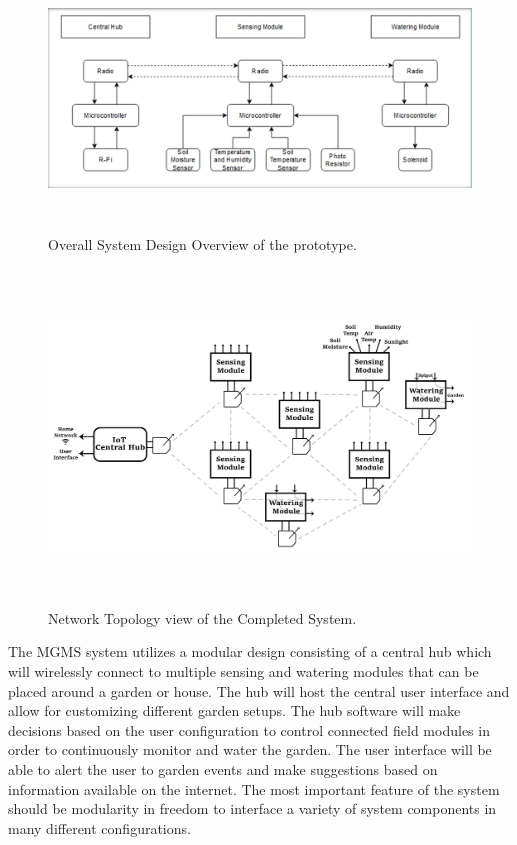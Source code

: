 \documentclass{report}
\begin{document}
\begin{figure}[H] %
    \centering
    \includegraphics[height=2.75in]{PNGs/SystemDesign.PNG}
    \caption{Overall System Design Overview of the prototype.}
    \label{fig:SystemDiagram}
\end{figure}

\begin{figure}[H] %
    \centering
    \includegraphics[height=3.5in]{PNGs/SystemDiagram.jpg}
    \caption{Network Topology view of the Completed System.}
    \label{fig:NetworkDiagram}
\end{figure}

The MGMS system utilizes a modular design consisting of a central hub which will wirelessly connect to multiple sensing and watering modules that can be placed around a garden or house. The hub will host the central user interface and allow for customizing different garden setups. The hub software will make decisions based on the user configuration to control connected field modules in order to continuously monitor and water the garden. The user interface will be able to alert the user to garden events and make suggestions based on information available on the internet. The most important feature of the system should be modularity in freedom to interface a variety of system components in many different configurations.\\
\end{document}
